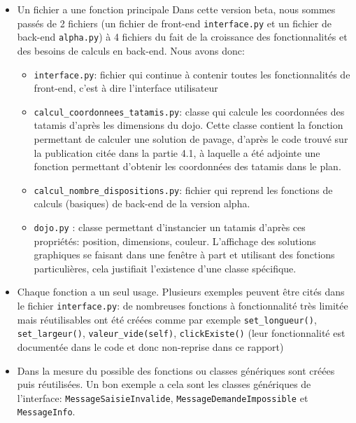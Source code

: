 \begin{itemize}
    \item Un fichier a une fonction principale
          Dans cette version beta, nous sommes passés de 2 fichiers (un fichier de front-end \texttt{interface.py} et un fichier de back-end \texttt{alpha.py}) à
          4 fichiers du fait de la croissance des fonctionnalités et des besoins de calculs en back-end. Nous avons donc:
          \begin{itemize}
              \item \texttt{interface.py}: fichier qui continue à contenir toutes les fonctionnalités de front-end, c’est à dire l’interface utilisateur
              \item \texttt{calcul\_coordonnees\_tatamis.py}: classe qui calcule les coordonnées des tatamis d'après les dimensions du dojo.
                    Cette classe contient la fonction permettant de calculer une solution de pavage, d’après le code trouvé sur la publication
                    citée dans la partie 4.1, à laquelle a été adjointe une fonction permettant d’obtenir les coordonnées des tatamis dans le plan.
              \item \texttt{calcul\_nombre\_dispositions.py}: fichier qui reprend les fonctions de calculs (basiques) de back-end de la version alpha.
              \item \texttt{dojo.py} : classe permettant d'instancier un tatamis d'après ces propriétés: position, dimensions, couleur. L’affichage
                    des solutions graphiques se faisant dans une fenêtre à part et utilisant des fonctions particulières, cela justifiait
                    l’existence d’une classe spécifique.
          \end{itemize}
    \item Chaque fonction a un seul usage. Plusieurs exemples peuvent être cités dans le fichier \texttt{interface.py}: de nombreuses
          fonctions à fonctionnalité très limitée mais réutilisables ont été créées comme par exemple \texttt{set\_longueur()}, \texttt{set\_largeur()}, 
          \texttt{valeur\_vide(self)}, \texttt{clickExiste()} (leur fonctionnalité est documentée dans le code et donc non-reprise dans ce rapport)

    \item Dans la mesure du possible des fonctions ou classes génériques sont créées puis réutilisées.
          Un bon exemple a cela sont les classes génériques de l’interface: \texttt{MessageSaisieInvalide}, \texttt{MessageDemandeImpossible} et \texttt{MessageInfo}.
\end{itemize}




